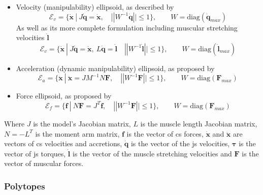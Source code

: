 \begin{itemize}
\itemindent=-13pt
\item Velocity (manipulability) ellipsoid, as described by \citet{yoshikawa1985manipulability}
\begin{equation}\label{eq:ev_dq_h}
\mathcal{E}_v = \{\dot{\bm{x}}~ |~ J\dot{\bm{q}} = \dot{\bm{x}}, \quad ||W^{-1}\dot{\bm{q}}|| \leq 1\}, \qquad W = \text{diag}(\dot{\bm{q}}_{max})
\end{equation}
\hspace{-13pt}
As well as its more complete formulation including muscular stretching velocities $\dot{\bm{l}}$
\begin{equation}\label{eq:ev_h}
\mathcal{E}_v = \{\dot{\bm{x}}~ |~ J\dot{\bm{q}} = \dot{\bm{x}},~ L\dot{\bm{q}} = \dot{\bm{l}} \quad ||W^{-1}\dot{\bm{l}}|| \leq 1\}, \qquad W = \text{diag}(\dot{\bm{l}}_{max})
\end{equation}

\item Acceleration (dynamic manipulability) ellipsoid, as proposed by \citet{khatib2009robotics}
\begin{equation}\label{eq:ea_h}
\mathcal{E}_{a} = \{\ddot{\bm{x}}~ |~ \ddot{\bm{x}} = JM^{-1}N\bm{F}, \quad ||W^{-1}\bm{F}|| \leq 1\}, \qquad W = \text{diag}(\bm{F}_{max})
\end{equation}

\item Force ellipsoid, as proposed by \citet{petric2019assistive}
\begin{equation}\label{eq:ef_h}
\mathcal{E}_{f} = \{\bm{f}~ |~ N\bm{F}  = J^T\bm{f},\quad ||W^{-1}\bm{F}|| \leq 1\}, \qquad W = \text{diag}(\bm{F}_{max})
\end{equation}
\end{itemize}
Where $J$ is the model's Jacobian matrix, $L$ is the muscle length Jacobian matrix, $N= -L^T$ is the moment arm matrix, $\bm{f}$ is the vector of \gls{cs} forces, $\dot{\bm{x}}$ and $\ddot{\bm{x}}$ are vectors of \gls{cs} velocities and accretions, $\dot{\bm{q}}$ is the vector of the \gls{js} velocities, $\bm{\tau}$ is the vector of \gls{js} torques, $\dot{\bm{l}}$ is the vector of the muscle stretching velocities and $\bm{F}$ is the vector of muscular forces. 

\subsubsection*{Polytopes}

